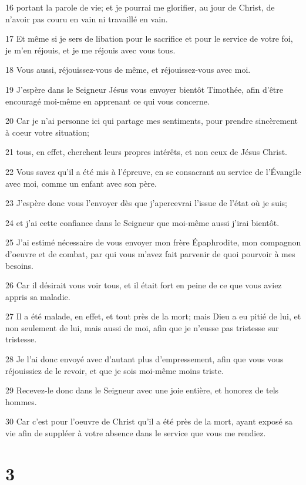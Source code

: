\par 16 portant la parole de vie; et je pourrai me glorifier, au jour de Christ, de n'avoir pas couru en vain ni travaillé en vain.
\par 17 Et même si je sers de libation pour le sacrifice et pour le service de votre foi, je m'en réjouis, et je me réjouis avec vous tous.
\par 18 Vous aussi, réjouissez-vous de même, et réjouissez-vous avec moi.
\par 19 J'espère dans le Seigneur Jésus vous envoyer bientôt Timothée, afin d'être encouragé moi-même en apprenant ce qui vous concerne.
\par 20 Car je n'ai personne ici qui partage mes sentiments, pour prendre sincèrement à coeur votre situation;
\par 21 tous, en effet, cherchent leurs propres intérêts, et non ceux de Jésus Christ.
\par 22 Vous savez qu'il a été mis à l'épreuve, en se consacrant au service de l'Évangile avec moi, comme un enfant avec son père.
\par 23 J'espère donc vous l'envoyer dès que j'apercevrai l'issue de l'état où je suis;
\par 24 et j'ai cette confiance dans le Seigneur que moi-même aussi j'irai bientôt.
\par 25 J'ai estimé nécessaire de vous envoyer mon frère Épaphrodite, mon compagnon d'oeuvre et de combat, par qui vous m'avez fait parvenir de quoi pourvoir à mes besoins.
\par 26 Car il désirait vous voir tous, et il était fort en peine de ce que vous aviez appris sa maladie.
\par 27 Il a été malade, en effet, et tout près de la mort; mais Dieu a eu pitié de lui, et non seulement de lui, mais aussi de moi, afin que je n'eusse pas tristesse sur tristesse.
\par 28 Je l'ai donc envoyé avec d'autant plus d'empressement, afin que vous vous réjouissiez de le revoir, et que je sois moi-même moins triste.
\par 29 Recevez-le donc dans le Seigneur avec une joie entière, et honorez de tels hommes.
\par 30 Car c'est pour l'oeuvre de Christ qu'il a été près de la mort, ayant exposé sa vie afin de suppléer à votre absence dans le service que vous me rendiez.

\chapter{3}

